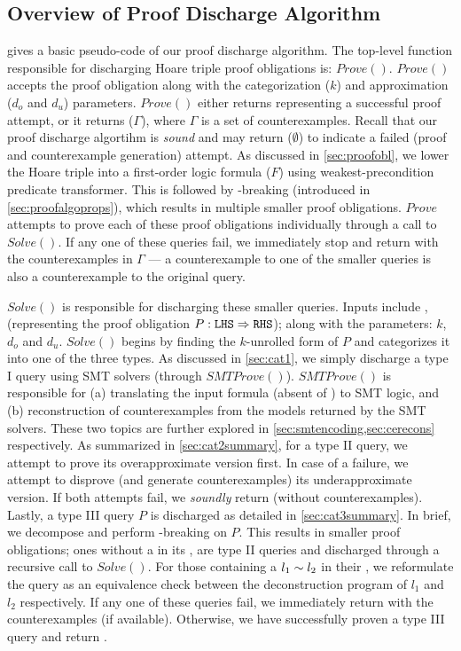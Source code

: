 \subsection{Overview of Proof Discharge Algorithm}
 gives a basic pseudo-code of our proof discharge algorithm.
The top-level function responsible for discharging Hoare triple proof obligations is: $Prove()$.
$Prove()$ accepts the proof obligation along with the categorization ($k$)
and approximation ($d_o$ and $d_u$) parameters.
$Prove()$ either returns  representing a successful proof attempt,
or it returns ($\Gamma$), where $\Gamma$ is a set of counterexamples.
Recall that our proof discharge algortihm is {\em sound} and may return ($\emptyset$)
to indicate a failed (proof and counterexample generation) attempt.
As discussed in \cref{sec:proofobl}, we lower the Hoare triple into a first-order logic
formula ($F$) using weakest-precondition predicate transformer.
This is followed by \rhs{}-breaking (introduced in \cref{sec:proofalgoprops}),
which results in multiple smaller proof obligations.
$Prove{}$ attempts to prove each of these proof obligations individually through a call to $Solve()$.
If any one of these queries fail, we immediately stop and return  with the
counterexamples in $\Gamma$ --- a counterexample to one of the smaller queries is also a counterexample
to the original query.

$Solve()$ is responsible for discharging these smaller queries.
Inputs include \lhs{}, \rhs{} (representing the proof obligation $P :{\tt LHS}{} \Rightarrow {\tt RHS}{}$);
along with the parameters: $k$, $d_o$ and $d_u$.
$Solve()$ begins by finding the $k$-unrolled form of $P$ and categorizes it into one of the three types.
As discussed in \cref{sec:cat1}, we simply discharge a type I query using SMT solvers (through $SMTProve()$).
$SMTProve()$ is responsible for (a) translating the input formula (absent of \recursiveRelations{})
to SMT logic, and (b) reconstruction of counterexamples from the models returned by the SMT solvers.
These two topics are further explored in \cref{sec:smtencoding,sec:cerecons} respectively.
As summarized in \cref{sec:cat2summary}, for a type II query, we attempt to prove its
overapproximate version first.
In case of a failure, we attempt to disprove (and generate counterexamples) its underapproximate version.
If both attempts fail, we {\em soundly} return  (without counterexamples).
Lastly, a type III query $P$ is discharged as detailed in \cref{sec:cat3summary}.
In brief, we decompose and perform \rhs{}-breaking on $P$.
This results in smaller proof obligations; ones without a \recursiveRelation{} in its \rhs{},
are type II queries and discharged through a recursive call to $Solve()$.
For those containing a \recursiveRelation{} $l_1 \sim{} l_2$ in their \rhs{}, we reformulate the query as an
equivalence check between the deconstruction program of $l_1$ and $l_2$ respectively.
If any one of these queries fail, we immediately return  with the counterexamples (if available).
Otherwise, we have successfully proven a type III query and return .
